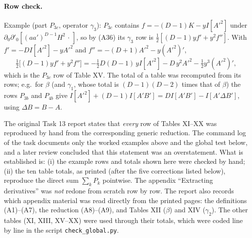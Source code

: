\paragraph{Row check.} Example (part $P_{3c}$, operator $\gamma_3$): $P_{3c}$ contains $f=-(D-1)K-yI[A'^2]$ under
$\partial_0\partial'_0[(aa')^{D-1}H^2\,\cdot\,]$, so by (A36) its $\gamma_3$ row is $\frac12[(D-1)yf'+y^2f'']$. With
$f'=-DI[A'^2]-yA'^2$ and $f''=-(D+1)A'^2-y(A'^2)'$,
\begin{equation}
\tfrac12\big[(D-1)yf'+y^2f''\big]=-\tfrac12D(D-1)\,yI[A'^2]-D\,y^2A'^2-\tfrac12y^3(A'^2)' ,
\end{equation}
which is the $P_{3c}$ row of Table XV. The total of a table was recomputed from its rows; e.g.\ for $\beta$ (and $\gamma_1$, whose total is
$(D-1)(D-2)$ times that of $\beta$) the rows $P_{3b}$ and $P_{4b}$ give $I[A'^2]+(D-1)I[A'B']=DI[A'B']-I[A'\Delta B']$, using
$\Delta B=B-A$.

\begin{discbox}
The original Task 13 report states that \emph{every} row of Tables XI--XX was reproduced by hand from the corresponding generic reduction.
The command log of the task documents only the worked examples above and the global test below, and a later review concluded that this
statement was an overstatement. What is established is: (i) the example rows and totals shown here were checked by hand; (ii) the ten table
totals, as printed (after the five corrections listed below), reproduce the direct sum $\sum_kP_k$ pointwise. The appendix ``Extracting
derivatives'' was \emph{not} redone from scratch row by row. The report also records which appendix material was read directly from the printed
pages: the definitions (A1)--(A7), the reduction (A8)--(A9), and Tables XII ($\beta$) and XIV ($\gamma_2$). The other tables (XI, XIII,
XV--XX) were used through their totals, which were coded line by line in the script \texttt{check\_global.py}.
\end{discbox}

